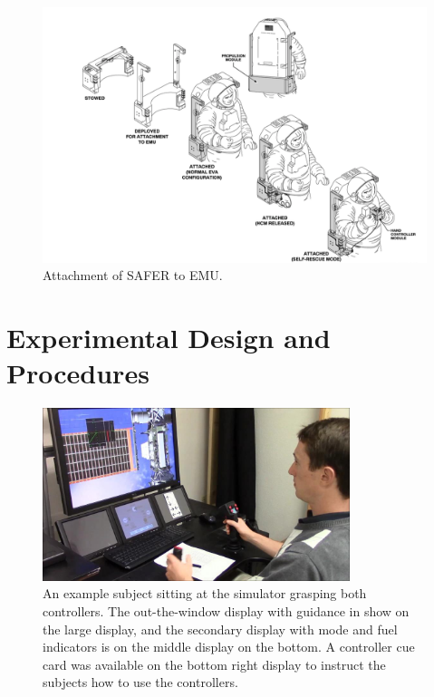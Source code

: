 \documentclass[]{aiaa-tc}%
\begin{document}
\begin{figure}[tb!]
  \centering
  \includegraphics[width=0.8\linewidth]{figs/SAFER_diagram.png}
  \caption{Attachment of SAFER to EMU.~\cite{safer}}
  \label{fig:safer_hardware}
\end{figure}

\section{Experimental Design and Procedures}

\begin{figure}[tb!]
  \centering
  \includegraphics[width=0.8\textwidth]{figs/SAFER_DangerChris.jpg}
  \caption[An example subject sitting at the simulator grasping both controllers]{An example subject sitting at the simulator grasping both controllers. The out-the-window display with guidance in show on the large display, and the secondary display with mode and fuel indicators is on the middle display on the bottom. A controller cue card was available on the bottom right display to instruct the subjects how to use the controllers.}
  \label{fig:safer_subject}
\end{figure}
\end{document}
